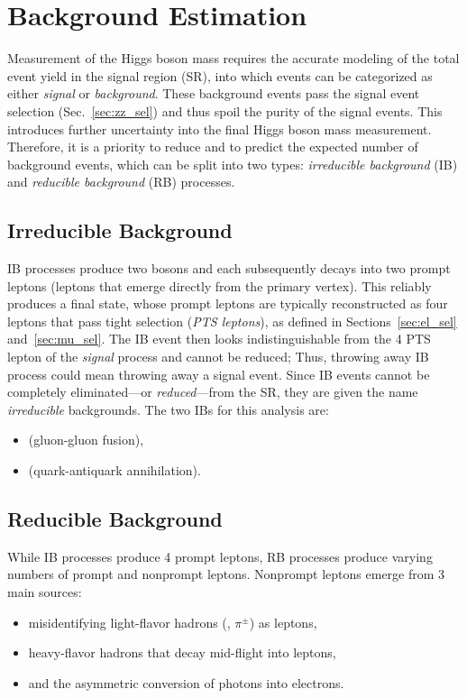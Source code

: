 \section{Background Estimation}
\label{sec:bkg_estim}
Measurement of the Higgs boson mass requires the accurate modeling of the total event yield in the signal region (SR), into which events can be categorized as either \emph{signal} or \emph{background}.
These background events pass the signal event selection (Sec.~\ref{sec:zz_sel}) and thus spoil the purity of the signal events.
This introduces further uncertainty into the final Higgs boson mass measurement.
Therefore, it is a priority to reduce and to predict the expected number of background events, which can be split into two types: \emph{irreducible background} (IB) and \emph{reducible background} (RB) processes.

\subsection{Irreducible Background}
\label{sec:bkg_irred}
IB processes produce two \PZ bosons and each \PZ subsequently decays into two prompt leptons (leptons that emerge directly from the primary vertex).
This reliably produces a \fourl final state, whose prompt leptons are typically reconstructed as four leptons that pass tight selection (\emph{PTS leptons}), as defined in Sections~\ref{sec:el_sel} and~\ref{sec:mu_sel}.
The IB event then looks indistinguishable from the 4 PTS lepton of the \emph{signal} process and cannot be reduced;
Thus, throwing away IB process could mean throwing away a signal event.
Since IB events cannot be completely eliminated---or \emph{reduced}---from the SR, they are given the name \emph{irreducible} backgrounds.
The two IBs for this analysis are:
\begin{itemize}
    \item \ggzzfourl (gluon-gluon fusion),
    \item \qqzzfourl (quark-antiquark annihilation).
\end{itemize}

\subsection{Reducible Background}
\label{sec:redbkg}
While IB processes produce 4 prompt leptons, RB processes produce varying numbers of prompt and nonprompt leptons.
Nonprompt leptons emerge from 3 main sources:
\begin{itemize}
    \item misidentifying light-flavor hadrons (\eg, $\pi^{\pm}$) as leptons,
    \item heavy-flavor hadrons that decay mid-flight into leptons,
    \item and the asymmetric conversion of photons into electrons.
\end{itemize}

